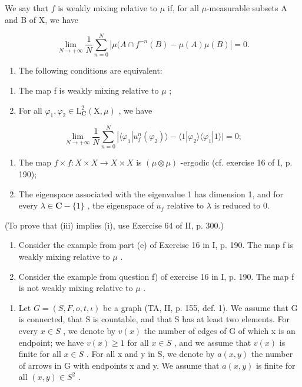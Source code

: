 We say that \(f\) is weakly mixing relative to \(\mu\) if, for all \(\mu\)-measurable subsets A and B of X, we have

\[
\lim _ {N \rightarrow + \infty} \frac {1}{N} \sum_ {n = 0} ^ {N} | \mu (A \cap f ^ {- n} (B) - \mu (A) \mu (B) | = 0.
\]

\begin{enumerate}
\def\labelenumi{\alph{enumi})}
\tightlist
\item
  The following conditions are equivalent:
\end{enumerate}

\begin{enumerate}
\def\labelenumi{(\roman{enumi})}
\item
  The map f is weakly mixing relative to \(\mu\) ;
\item
  For all \(\varphi_{1},\varphi_{2} \in \mathrm{L}_{\mathbf{C}}^{2}(\mathrm{X}, \mu)\) , we have
\end{enumerate}

\[
\lim _ {N \to + \infty} \frac {1}{N} \sum_ {n = 0} ^ {N} | \langle \varphi_ {1} | u _ {f} ^ {n} (\varphi_ {2}) \rangle - \langle 1 | \varphi_ {2} \rangle \langle \varphi_ {1} | 1 \rangle | = 0;
\]

\begin{enumerate}
\def\labelenumi{(\roman{enumi})}
\setcounter{enumi}{2}
\item
  The map \(f \times f: X \times X \to X \times X\) is \((\mu \otimes \mu)\) -ergodic (cf. exercise 16 of I, p. 190);
\item
  The eigenspace associated with the eigenvalue 1 has dimension 1, and for every \(\lambda \in \mathbf{C} - \{1\}\) , the eigenspace of \(u_{f}\) relative to \(\lambda\) is reduced to 0.
\end{enumerate}

(To prove that (iii) implies (i), use Exercise 64 of II, p. 300.)

\begin{enumerate}
\def\labelenumi{\alph{enumi})}
\setcounter{enumi}{1}
\item
  Consider the example from part (e) of Exercise 16 in I, p. 190. The map f is weakly mixing relative to \(\mu\) .
\item
  Consider the example from question f) of exercise 16 in I, p. 190. The map f is not weakly mixing relative to \(\mu\) .
\end{enumerate}

\begin{enumerate}
\def\labelenumi{\arabic{enumi})}
\setcounter{enumi}{14}
\tightlist
\item
  Let \(G = (S, F, o, t, \iota)\) be a graph (TA, II, p. 155, def. 1). We assume that G is connected, that S is countable, and that S has at least two elements. For every \(x \in S\) , we denote by \(v(x)\) the number of edges of G of which x is an endpoint; we have \(v(x) \geqslant 1\) for all \(x \in S\) , and we assume that \(v(x)\) is finite for all \(x \in S\) . For all x and y in S, we denote by \(a(x, y)\) the number of arrows in G with endpoints x and y. We assume that \(a(x, y)\) is finite for all \((x, y) \in S^{2}\) .
\end{enumerate}

